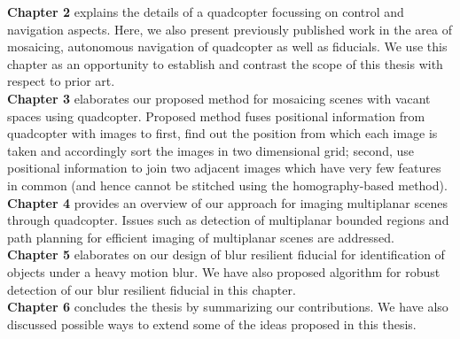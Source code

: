 \noindent \textbf{Chapter 2} explains the details of a quadcopter focussing on
control and navigation aspects. Here, we also present previously published work
in the area of mosaicing, autonomous navigation of quadcopter as well as
fiducials. We use this chapter as an opportunity to establish and contrast the
scope of this thesis with respect to prior art.\\

\noindent \textbf{Chapter 3} elaborates our proposed method for mosaicing
scenes with vacant spaces using quadcopter. Proposed method fuses positional
information from quadcopter with images to first, find out the position from which each
image is taken and accordingly sort the images in two dimensional grid; second,
use positional information to join two adjacent images which have very few features
in common (and hence cannot be stitched using the homography-based method).\\

\noindent \textbf{Chapter 4} provides an overview of our approach
for imaging multiplanar scenes through quadcopter. Issues such as detection of
multiplanar bounded regions and path planning for efficient imaging of multiplanar scenes
are addressed.\\

\noindent \textbf{Chapter 5} elaborates on our design of blur
resilient fiducial for identification of objects under a heavy motion blur. We
have also proposed algorithm for robust detection of our blur resilient
fiducial in this chapter.\\
 
 \noindent \textbf{Chapter 6} concludes the thesis by summarizing our
 contributions.
  We have also discussed possible ways to extend some of the ideas proposed in this thesis.
